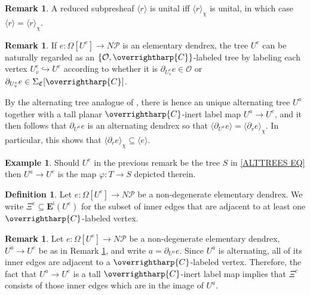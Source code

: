 \documentclass[a4paper,10pt
,draft
]{article}%
\numberwithin{equation}{section}
\numberwithin{figure}{section}
\theoremstyle{definition} %
\newtheorem{definition}[equation]{Definition}%
\newtheorem{example}[equation]{Example}%
\newtheorem{remark}[equation]{Remark}%
\newcommand{\into}{\hookrightarrow}%
\newcommand{\vect}[1]{\text{\overrightharp{\ensuremath{#1}}}}
\renewcommand{\O}{\ensuremath{\mathcal O}}
\newcommand{\1}{\ensuremath{\mathbbm 1}}%
\begin{document}
\begin{remark}\label{UNITALCASE REM}
	A reduced subpresheaf $\langle r \rangle$
	is unital iff 
	$\langle r \rangle_{\chi}$ is unital, in which case
	$\langle r \rangle = \langle r \rangle_{\chi}$.
\end{remark}



\begin{remark}\label{ELEMLABEL REM}
	If $e \colon \Omega[U^e] \to N \mathcal{P}$
	is an elementary dendrex, 
	the tree $U^e$ can be naturally regarded as an
	$\{\O,\vect{C}\}$-labeled tree by labeling each vertex $U^e_v \into U^e$ according to whether
	it is $\partial_{U^e_v} e \in \O $ or
	$ \partial_{U^e_v} e \in \Sigma_{\mathfrak{C}}[\vect{C}]$.
	
	By the alternating tree analogue of
	\cite[Prop. 5.49]{BP_geo}, there is hence an unique alternating tree $U^a$ together with a tall planar $\vect{C}$-inert label map $U^a \to U^e$,
	and it then follows that
	$\partial_{U^a} e$ is an alternating dendrex so that
	$\langle \partial_{U^a} e \rangle = \langle \partial_r e \rangle_{\chi}$.
	In particular, this shows that
	$\langle \partial_r e \rangle_{\chi} \subseteq 
	\langle e \rangle$.
\end{remark}

\begin{example}
	Should $U^e$ in the previous remark be the tree $S$ in 
	\eqref{ALTTREES EQ} then $U^a \to U^e$ is the map
	$\varphi\colon T \to S$ depicted therein. 
\end{example}

\begin{definition}\label{XIEDGES DEF}
	Let $e \colon \Omega[U^e] \to N \mathcal{P}$ be a non-degenerate elementary dendrex. 
	We write
	$\Xi^e \subseteq \boldsymbol{E}^{\mathsf{i}}(U^e)$
	for the subset of inner edges that are adjacent to at least one $\vect{C}$-labeled vertex.
\end{definition}



\begin{remark}\label{XIEREDEF REM}
	Let $e \colon \Omega[U^e] \to N \mathcal{P}$ be a non-degenerate elementary dendrex, 
	$U^a \to U^e$ be as in Remark \ref{ELEMLABEL REM}, 
	and write $a = \partial_{U^a} e$.
	Since $U^a$ is alternating, all of its inner edges are adjacent to a 
	$\vect{C}$-labeled vertex. 
	Therefore, the fact that $U^a \to U^e$ is a tall $\vect{C}$-inert label map
	implies that $\Xi^e$ consists of those inner edges which are in the image of $U^a$.
\end{remark}
\end{document}
